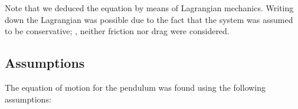 Note that we deduced the equation by means of Lagrangian mechanics. Writing down the Lagrangian was possible due to the fact that the system was assumed to be conservative; \ie, neither friction nor drag were considered.


\subsection{Assumptions}
The equation of motion for the pendulum was found using the following assumptions:
